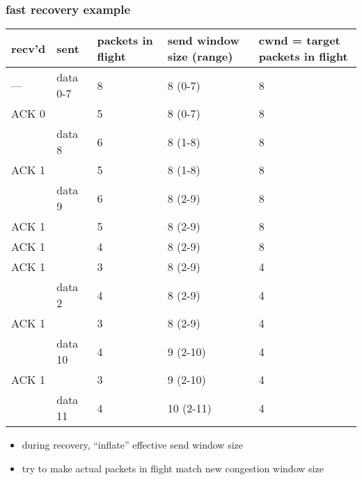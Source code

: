 \begin{frame}
\frametitle{fast recovery example}
{\fontsize{9}{10}\selectfont
\begin{tabular}{lllll}
recv'd & sent & packets in flight & send window size (range) & cwnd = target packets in flight\\ \hline
--- & data 0-7 & 8 & 8 (0-7) & 8\\
ACK 0 & ~ & 5 & 8 (0-7) & 8 \\
~ & data 8 & 6 & 8 (1-8) & 8\\
ACK 1 & ~ & 5  & 8 (1-8) & 8\\
~ & data 9 & 6 & 8 (2-9) & 8\\
ACK 1 & ~  & 5 & 8 (2-9) & 8\\
ACK 1 & ~  & 4 & 8 (2-9) & 8\\
ACK 1 & ~ & 3 &  8 (2-9) & 4 \\
~ & data 2 & 4 & 8 (2-9) & 4\\
ACK 1 & ~ & 3 &  8 (2-9) & 4 \\
~ & data 10 & 4 & 9 (2-10) & 4\\
ACK 1 & ~ & 3 &  9 (2-10) & 4 \\
~ & data 11 & 4 &  10 (2-11) & 4 \\
\end{tabular}
}
\begin{itemize}
    \item during recovery, ``inflate'' effective send window size
    \item try to make actual packets in flight match new congestion window size
\end{itemize}
\end{frame}
